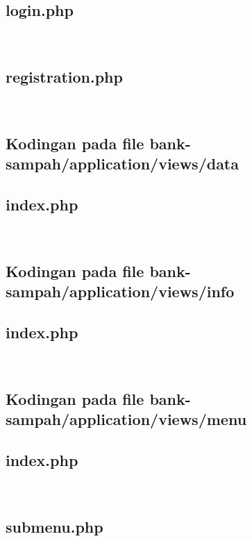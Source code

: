 \subsection{login.php}
\hfill\\

\subsection{registration.php}
\hfill\\


\subsection{Kodingan pada file bank-sampah/application/views/data}
\subsection{index.php}
\hfill\\


\subsection{Kodingan pada file bank-sampah/application/views/info}
\subsection{index.php}
\hfill\\


\subsection{Kodingan pada file bank-sampah/application/views/menu}
\subsection{index.php}
\hfill\\

\subsection{submenu.php}
\hfill\\


